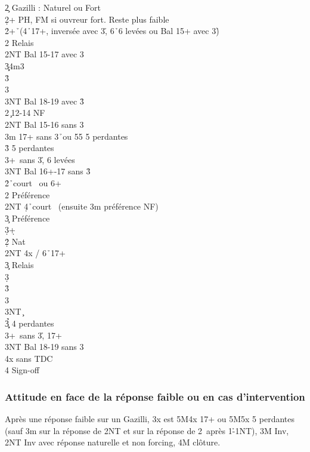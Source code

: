 \documentclass[a4paper]{article}
\begin{document}
\begin{bidtable}
2\c \> Gazilli : Naturel ou Fort\+\\
2\d {}+ PH, FM si ouvreur fort. Reste plus faible\+\\
2\h {}+\h\ (4\h\ 17+, inversée avec 3\h , 6\h\ 6 levées ou Bal 15+ avec 3\h )\+\\
2\s \> Relais\+\\
2NT \> Bal 15-17 avec 3\h \\
3\c\d {}\s 4m3\h \\
3\h {}\h \\
3\s {}\h \\
3NT \> Bal 18-19 avec 3\h \-\-\\
2\s {}\c\ 12-14 NF\\
2NT \> Bal 15-16 sans 3\h \\
3m  17+ sans 3\h\ ou 55 5 perdantes\\
3\h {} 5 perdantes\\
3\s {}+\s\ sans 3\h , 6 levées\\
3NT \> Bal 16+-17 sans 3\h \-\\
2\h {}\h\ court \s\ ou 6+\h \\
2\s \> Préférence\\
2NT \d 4\h\ court \s\ (ensuite 3m préférence NF)\\
3\c \> Préférence\\
3\d {}+\d \-\\
2\d\h\s \> Nat\\
2NT \s 4x / 6\h\ 17+\+\\
3\c \> Relais\+\\
3\d {}\d \\
3\h {}\h \\
3\s {}\h \\
3NT \c \-\-\\
3\c\d\h {} 4 perdantes\\
3\s {}+\s\ sans 3\h , 17+\\
3NT \> Bal 18-19 sans 3\h \\
4x  sans TDC\\
4\s \> Sign-off
\end{bidtable}

\subsubsection{Attitude en face de la réponse faible ou en cas d'intervention}

Après une réponse faible sur un Gazilli, 3x est 5M4x 17+ ou 5M5x 5 perdantes (sauf 3m sur la réponse de 2NT et sur la réponse de 2\s\ après 1\h -1NT), 3M Inv, 2NT Inv avec réponse naturelle et non forcing, 4M clôture.
\end{document}
